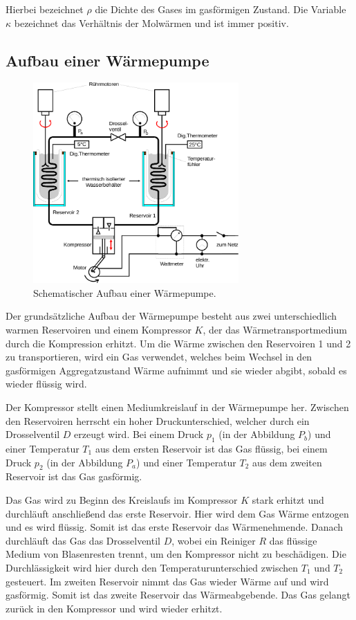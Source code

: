     Hierbei bezeichnet $\rho$ die Dichte des Gases im gasförmigen Zustand.
    Die Variable $\kappa$ bezeichnet das Verhältnis der Molwärmen und ist immer positiv.


\subsection{Aufbau einer Wärmepumpe}
\label{sec:Aufbau}

    \begin{figure}
      \centering
      \includegraphics[width=0.7\textwidth]{content/img/Abb_2.pdf}
      \caption{Schematischer Aufbau einer Wärmepumpe. \cite{versuchsanleitung}}
      \label{fig:aufbau}
    \end{figure}


    Der grundsätzliche Aufbau der Wärmepumpe besteht aus zwei unterschiedlich warmen Reservoiren und einem Kompressor $K$,
    der das Wärmetransportmedium durch die Kompression erhitzt.
    Um die Wärme zwischen den Reservoiren 1 und 2 zu transportieren,
    wird ein Gas verwendet,
    welches beim Wechsel in den gasförmigen
    Aggregatzustand Wärme aufnimmt und sie wieder abgibt,
    sobald es wieder flüssig wird.

    Der Kompressor stellt einen Mediumkreislauf in der Wärmepumpe her.
    Zwischen den Reservoiren herrscht ein hoher Druckunterschied,
    welcher durch ein Drosselventil $D$ erzeugt wird.
    Bei einem Druck $p_1$ (in der Abbildung $P_b$) und einer Temperatur $T_1$ aus dem ersten Reservoir ist das Gas flüssig,
    bei einem Druck $p_2$ (in der Abbildung $P_a$) und einer Temperatur $T_2$ aus dem zweiten Reservoir ist das Gas gasförmig.

    Das Gas wird zu Beginn des Kreislaufs im Kompressor $K$ stark erhitzt und durchläuft anschließend das erste Reservoir.
    Hier wird dem Gas Wärme entzogen und es wird flüssig.
    Somit ist das erste Reservoir das Wärmenehmende.
    Danach durchläuft das Gas das Drosselventil $D$,
    wobei ein Reiniger $R$ das flüssige Medium von Blasenresten trennt,
    um den Kompressor nicht zu beschädigen.
    Die Durchlässigkeit wird hier durch den Temperaturunterschied zwischen $T_1$ und $T_2$ gesteuert.
    Im zweiten Reservoir nimmt das Gas wieder Wärme auf und wird gasförmig.
    Somit ist das zweite Reservoir das Wärmeabgebende.
    Das Gas gelangt zurück in den Kompressor und wird wieder erhitzt.
